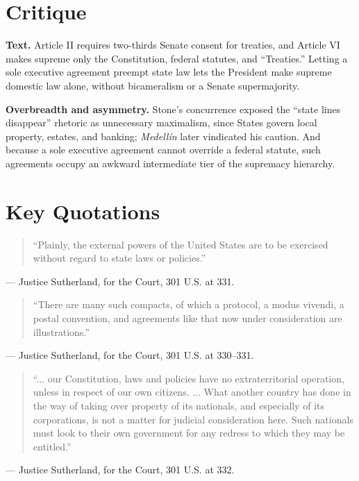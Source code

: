 \documentclass[12pt]{article}
\begin{document}
\section{Critique}

\textbf{Text.} Article II requires two-thirds Senate consent for treaties, and Article VI makes supreme only the Constitution, federal statutes, and ``Treaties.'' Letting a sole executive agreement preempt state law lets the President make supreme domestic law alone, without bicameralism or a Senate supermajority.

\textbf{Overbreadth and asymmetry.} Stone's concurrence exposed the ``state lines disappear'' rhetoric as unnecessary maximalism, since States govern local property, estates, and banking; \textit{Medell\'in} later vindicated his caution. And because a sole executive agreement cannot override a federal statute, such agreements occupy an awkward intermediate tier of the supremacy hierarchy.

\section{Key Quotations}

\begin{quote}
``Plainly, the external powers of the United States are to be exercised without regard to state laws or policies.''
\end{quote}
\noindent --- Justice Sutherland, for the Court, 301 U.S. at 331.

\begin{quote}
``There are many such compacts, of which a protocol, a modus vivendi, a postal convention, and agreements like that now under consideration are illustrations.''
\end{quote}
\noindent --- Justice Sutherland, for the Court, 301 U.S. at 330--331.

\begin{quote}
``... our Constitution, laws and policies have no extraterritorial operation, unless in respect of our own citizens. ... What another country has done in the way of taking over property of its nationals, and especially of its corporations, is not a matter for judicial consideration here. Such nationals must look to their own government for any redress to which they may be entitled.''
\end{quote}
\noindent --- Justice Sutherland, for the Court, 301 U.S. at 332.
\end{document}
